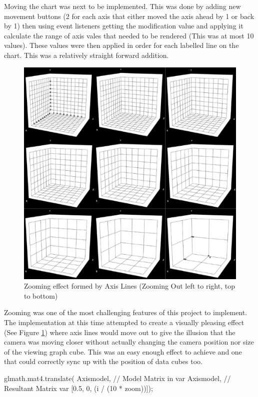 Moving the chart was next to be implemented. This was done by adding new movement buttons (2 for each axis that either moved the axis ahead by 1 or back by 1) then using event listeners getting the modification value and applying it calculate the range of axis vales that needed to be rendered (This was at most 10 values). These values were then applied in order for each labelled line on the chart. This was a relatively straight forward addition.
\begin{figure}[h]
    \centering
    \includegraphics[width=1\columnwidth]{author-files/figures/oldzooms.png}
    \caption{Zooming effect formed by Axis Lines (Zooming Out left to right, top to bottom)}
    \label{fig:oldzoom}
\end{figure}

Zooming was one of the most challenging features of this project to implement. The implementation at this time attempted to create a visually pleasing effect (See Figure \ref{fig:oldzoom}) where axis lines would move out to give the illusion that the camera was moving closer without actually changing the camera position nor size of the viewing graph cube. This was an easy enough effect to achieve and one that could correctly sync up with the position of data cubes too.

\begin{code}
    glmath.mat4.translate(
    Axismodel, // Model Matrix in var
    Axismodel, // Resultant Matrix var
        [0.5, 0, (i / (10 * zoom))]);
\end{code}

